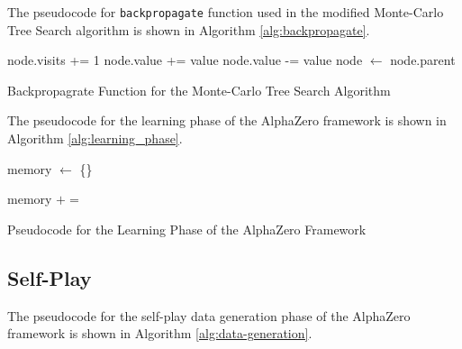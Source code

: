 The pseudocode for \verb|backpropagate| function used in the modified Monte-Carlo Tree Search algorithm is shown in Algorithm \ref{alg:backpropagate}.

\begin{algorithm}[htb]
    \begin{algorithmic}[1]
                \State node.visits += 1
                    \State node.value += value
                \Else
                    \State node.value -= value
                \EndIf
                \State node $\gets$ node.parent
            \EndWhile
        \EndFunction
    \end{algorithmic}
    \caption{Backpropagrate Function for the Monte-Carlo Tree Search Algorithm}
    \label{alg:backpropagate}
\end{algorithm}


The pseudocode for the  learning phase of the AlphaZero framework is shown in Algorithm \ref{alg:learning_phase}.

\begin{algorithm}[htb]
\begin{algorithmic}
            \State memory $\gets$ \{\}

                \State memory $+=$  
            \EndFor
            
                \State {}
            \EndFor
        \EndFor
    \EndFunction
    \caption{Pseudocode for the Learning Phase of the AlphaZero Framework}
    \label{alg:learning_phase}
\end{algorithmic}
\end{algorithm}

\subsection{Self-Play}

The pseudocode for the  self-play data generation phase of the AlphaZero framework is shown in Algorithm \ref{alg:data-generation}.

